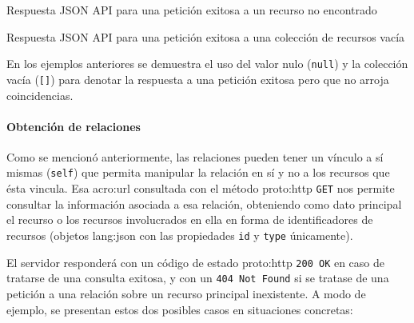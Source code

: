 \begin{listing}
  \caption{Respuesta JSON API para una petición exitosa a un recurso no encontrado}
  \label{soa:tecnologias:json-api:respuesta-200-recurso-nulo}
\end{listing}

\begin{listing}
  \caption{Respuesta JSON API para una petición exitosa a una colección de recursos vacía}
  \label{soa:tecnologias:json-api:respuesta-200-coleccion-vacia}
\end{listing}

En los ejemplos anteriores se demuestra el uso del valor nulo (\texttt{null}) y la colección vacía (\texttt{[]}) para denotar la respuesta a una petición exitosa pero que no arroja coincidencias.

\clearpage
\paragraph{Obtención de relaciones}

Como se mencionó anteriormente, las relaciones pueden tener un vínculo a sí mismas (\texttt{self}) que permita manipular la relación en sí y no a los recursos que ésta vincula. Esa \gls{acro:url} consultada con el método \gls{proto:http} \texttt{GET} nos permite consultar la información asociada a esa relación, obteniendo como dato principal el recurso o los recursos involucrados en ella en forma de identificadores de recursos (objetos \gls{lang:json} con las propiedades \texttt{id} y \texttt{type} únicamente).

El servidor responderá con un código de estado \gls{proto:http} \texttt{200 OK} en caso de tratarse de una consulta exitosa, y con un \texttt{404 Not Found} si se tratase de una petición a una relación sobre un recurso principal inexistente. A modo de ejemplo, se presentan estos dos posibles casos en situaciones concretas:

